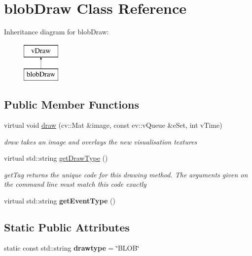 \hypertarget{classblobDraw}{}\section{blob\+Draw Class Reference}
\label{classblobDraw}
Inheritance diagram for blob\+Draw\+:\begin{figure}[H]
\begin{center}
\leavevmode
\includegraphics[height=2.000000cm]{classblobDraw}
\end{center}
\end{figure}
\subsection*{Public Member Functions}
\begin{DoxyCompactItemize}
\item 
virtual void \hyperlink{classblobDraw_ae29fcd93142586e3f3ab070f795f26fe}{draw} (cv\+::\+Mat \&image, const ev\+::v\+Queue \&e\+Set, int v\+Time)
\begin{DoxyCompactList}\small\item\em draw takes an image and overlays the new visualisation textures \end{DoxyCompactList}\item 
virtual std\+::string \hyperlink{classblobDraw_a72b6e196fcd44371a4cdfa734d19dc93}{get\+Draw\+Type} ()
\begin{DoxyCompactList}\small\item\em get\+Tag returns the unique code for this drawing method. The arguments given on the command line must match this code exactly \end{DoxyCompactList}\item 
virtual std\+::string {\bfseries get\+Event\+Type} ()\hypertarget{classblobDraw_a9edd0c705b8a24070d3e7ce84e4c9bde}{}\label{classblobDraw_a9edd0c705b8a24070d3e7ce84e4c9bde}

\end{DoxyCompactItemize}
\subsection*{Static Public Attributes}
\begin{DoxyCompactItemize}
\item 
static const std\+::string {\bfseries drawtype} = \char`\"{}B\+L\+OB\char`\"{}\hypertarget{classblobDraw_a79d4c5e42927549ee3ff075abaf87eb5}{}\label{classblobDraw_a79d4c5e42927549ee3ff075abaf87eb5}

\end{DoxyCompactItemize}
